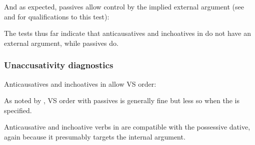 \begin{exe}
\begin{xlist}
\begin{xlist}
\begin{exe}
\begin{xlist}
\begin{xlist}
\begin{exe}
\begin{xlist}
\begin{xlist}
 \z
\z 
    
And as expected, passives allow control by the implied external argument (see \citealt{williams15} and \citealt{bhattpancheva17} for qualifications to this test):
 \begin{exe}
	
 \z 
    
The tests thus far indicate that anticausatives and inchoatives in {\tnif} do not have an external argument, while passives do.

	\subsubsection{Unaccusativity diagnostics} \label{vz:tnif:nact:unacc}
Anticausatives and inchoatives in {\tnif} allow VS order:
 \begin{exe}
 \ex   
 \begin{xlist} 
		
		
 \z
\z 

As noted by \citet[148]{shlonsky87}, VS order with passives is generally fine but less so when the  is specified.
 \begin{exe}
	
 \z 
  
Anticausative and inchoative verbs in {\tnif} are compatible with the possessive dative, again because it presumably targets the internal argument.
 \begin{exe}
 \ex  
 \begin{xlist} 
		

\end{xlist}
\end{exe}
\end{exe}
\end{xlist}
\end{exe}
\end{exe}
\end{xlist}
\end{xlist}
\end{exe}
\end{xlist}
\end{xlist}
\end{exe}
\end{xlist}
\end{xlist}
\end{exe}
